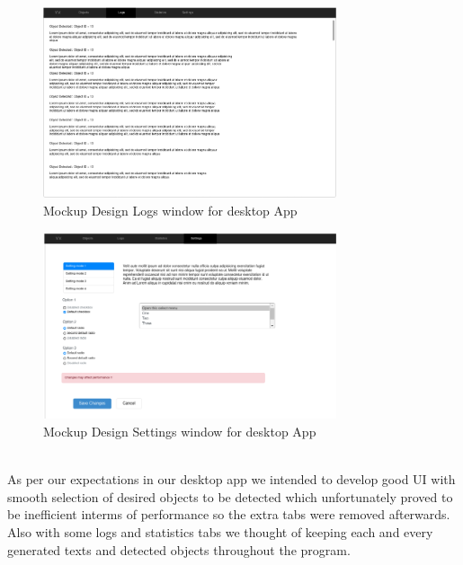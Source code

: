         \begin{figure}[ht]
                \centering
                        \includegraphics[width=0.77\textwidth]{img/VV2.png}
                        \caption{Mockup Design Logs window for desktop App}    
        \end{figure}
        \begin{figure}[ht]
                \centering
                        \includegraphics[width=0.77\textwidth]{img/VV3.png}
                        \caption{Mockup Design Settings window for desktop App}    
        \end{figure}\\
        As per our expectations in our desktop app we intended to develop good UI with smooth selection of desired objects to be detected which unfortunately proved to be inefficient interms of performance so the extra tabs were removed afterwards.
        Also with some logs and statistics tabs we thought of keeping each and every generated texts and detected objects throughout the program. 
        \pagebreak

